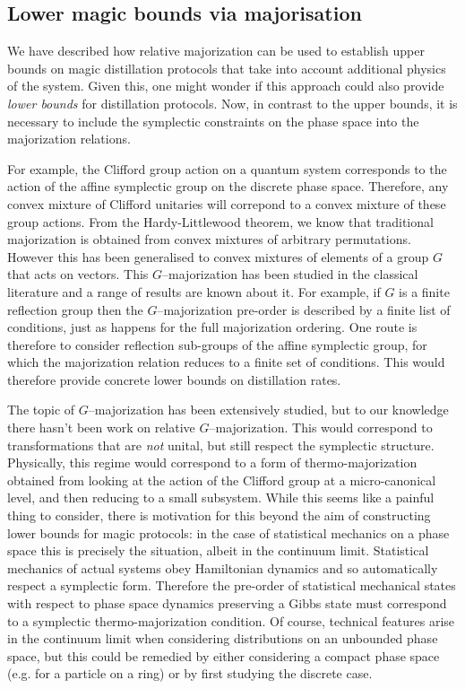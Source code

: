 \documentclass[pra,
aps,
twocolumn,
superscriptaddress,
groupedaddress,
nofootinbib,
reprint
]{revtex4-1}
\begin{document}
\subsection{Lower magic bounds via majorisation}
\label{sec:lower_bounds}

We have described how relative majorization can be used to establish upper bounds on magic distillation protocols that take into account additional physics of the system. Given this, one might wonder if this approach could also provide \emph{lower bounds} for distillation protocols. Now, in contrast to the upper bounds, it is necessary to include the symplectic constraints on the phase space into the majorization relations.

  For example, the Clifford group action on a quantum system corresponds to the action of the affine symplectic group on the discrete phase space. Therefore, any convex mixture of Clifford unitaries will correpond to a convex mixture of these group actions. From the Hardy-Littlewood theorem, we know that traditional majorization is obtained from convex mixtures of arbitrary permutations. However this has been generalised to convex mixtures of elements of a group $G$ that acts on vectors. This $G$--majorization has been studied in the classical literature and a range of results are known about it. For example, if $G$ is a finite reflection group then the $G$--majorization pre-order is described by a finite list of conditions, just as happens for the full majorization ordering. One route is therefore to consider reflection sub-groups of the affine symplectic group, for which the majorization relation reduces to a finite set of conditions. This would therefore provide concrete lower bounds on distillation rates.
  
  The topic of $G$--majorization has been extensively studied, but to our knowledge there hasn't been work on relative $G$--majorization. This would correspond to transformations that are \emph{not} unital, but still respect the symplectic structure. Physically, this regime would correspond to a form of thermo-majorization obtained from looking at the action of the Clifford group at a micro-canonical level, and then reducing to a small subsystem. While this seems like a painful thing to consider, there is motivation for this beyond the aim of constructing lower bounds for magic protocols: in the case of statistical mechanics on a phase space this is precisely the situation, albeit in the continuum limit. Statistical mechanics of actual systems obey Hamiltonian dynamics and so automatically respect a symplectic form. Therefore the pre-order of statistical mechanical states with respect to phase space dynamics preserving a Gibbs state must correspond to a symplectic thermo-majorization condition. Of course, technical features arise in the continuum limit when considering distributions on an unbounded phase space, but this could be remedied by either considering a compact phase space (e.g. for a particle on a ring) or by first studying the discrete case.
\end{document}
